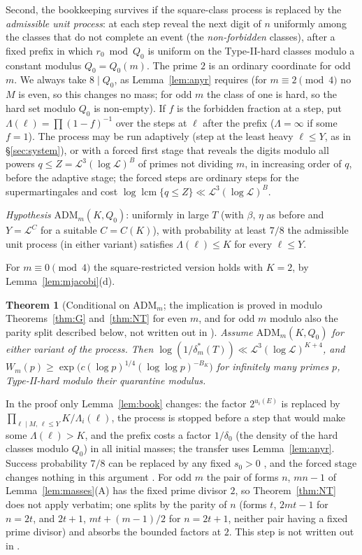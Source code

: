 \documentclass[11pt,reqno]{amsart}
\newtheorem{theorem}{Theorem}[section]
\theoremstyle{definition}
\newcommand{\lcm}{\operatorname{lcm}}
\newcommand{\Lc}{\mathcal L}
\begin{document}
Second, the bookkeeping survives if the square-class process is replaced by
the \emph{admissible unit process}: at each step reveal the next digit of $n$
uniformly among the classes that do not complete an event (the
\emph{non-forbidden} classes), after a fixed prefix in which $r_0\bmod Q_0$ is
uniform on the Type-II-hard classes modulo a constant modulus $Q_0=Q_0(m)$.
The prime $2$ is an ordinary coordinate for odd $m$.  We always take $8\mid Q_0$,
as Lemma~\ref{lem:anyr} requires (for $m\equiv2\pmod4$ no $M$ is even, so this
changes no mass; for odd $m$ the class of one is hard, so the hard set
modulo $Q_0$ is non-empty).  If $f$ is the forbidden fraction at a step, put
$\Lambda(\ell)=\prod(1-f)^{-1}$ over the steps at $\ell$ after the prefix ($\Lambda=\infty$ if some
$f=1$).  The process may be run adaptively (step at the least heavy $\ell\le Y$,
as in \S\ref{sec:system}), or with a forced first stage that reveals the
digits modulo all powers $q\le Z=\Lc^3(\log\Lc)^B$ of primes not dividing $m$, in increasing order of $q$,
before the adaptive stage; the forced steps are ordinary steps for the
supermartingales and cost $\log\lcm\{q\le Z\}\ll\Lc^3(\log\Lc)^B$.

\emph{Hypothesis} $\mathrm{ADM}_m(K,Q_0)$: uniformly in large $T$ (with $\beta$, $\eta$ as
before and $Y=\Lc^{C}$ for a suitable $C=C(K)$), with probability at least $7/8$ the
admissible unit process (in either variant) satisfies $\Lambda(\ell)\le K$ for every
$\ell\le Y$.

For $m\equiv0\pmod4$ the square-restricted version holds with $K=2$, by
Lemma~\ref{lem:mjacobi}(d).

\begin{theorem}[Conditional on $\mathrm{ADM}_m$; the implication is proved in {\cite{MN}} modulo Theorems~\ref{thm:G} and~\ref{thm:NT} for even $m$, and for odd $m$ modulo also the parity split described below, not written out in {\cite{MN}}]\label{thm:madm}
Assume $\mathrm{ADM}_m(K,Q_0)$ for either variant of the process.  Then $\log(1/\delta^*_m(T))\ll\Lc^3(\log\Lc)^{K+4}$, and
$W_m(p)\ge\exp\big(c(\log p)^{1/4}(\log\log p)^{-B_K}\big)$ for infinitely many primes $p$,
Type-II-hard modulo their quarantine modulus.
\end{theorem}

In the proof \cite[Thm.~5.1]{MN} only Lemma~\ref{lem:book} changes: the
factor $2^{u_i(E)}$ is replaced by $\prod_{\ell\mid M,\,\ell\le Y}K/\Lambda_i(\ell)$, the process
is stopped before a step that would make some $\Lambda(\ell)>K$, and the prefix
costs a factor $1/\delta_0$ (the density of the hard classes modulo $Q_0$) in all
initial masses; the transfer uses Lemma~\ref{lem:anyr}.  Success probability
$7/8$ can be replaced by any fixed $s_0>0$ \cite[Lemma~1.1]{MN2}, and the forced
stage changes nothing in this argument \cite[\S1, ``Order'']{MN2}.  For odd $m$
the pair of forms $n$, $mn-1$ of Lemma~\ref{lem:masses}(A) has the fixed prime
divisor $2$, so Theorem~\ref{thm:NT} does not apply verbatim; one splits by the
parity of $n$ (forms $t$, $2mt-1$ for $n=2t$, and $2t+1$, $mt+(m-1)/2$ for $n=2t+1$,
neither pair having a fixed prime divisor) and absorbs the bounded factors
at $2$.  This step is not written out in \cite{MN}.
\end{document}
